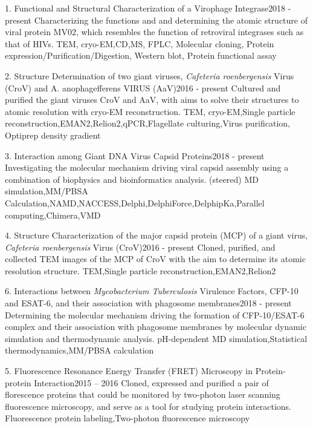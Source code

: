 %
%
%


\begin{projects}
	\project
	{1. Functional and Structural Characterization of a Virophage Integrase}{2018 - present}
	{Characterizing the functions and and determining the atomic structure of viral protein MV02, which resembles the function of retroviral integrases such as that of HIVs.}
	{TEM, cryo-EM,CD,MS, FPLC, Molecular cloning, Protein expression/Purification/Digestion, Western blot, Protein functional assay}
	
	\project
	{2. Structure Determination of two giant viruses, \textit{Cafeteria roenbergensis} Virus (CroV) and A. anophagefferens VIRUS (AaV)}{2016 - present}
	{Cultured and purified the giant viruses CroV and AaV, with aims to solve their structures  to atomic resolution with cryo-EM reconstruction.}
	{TEM, cryo-EM,Single particle reconstruction,EMAN2,Relion2,qPCR,Flagellate culturing,Virus purification, Optiprep density gradient}
	
	\project
	{3. Interaction among Giant DNA Virus Capsid Proteins}{2018 - present}
	{Investigating the molecular mechanism driving viral capsid assembly using a combination of biophysics and bioinformatics analysis.}
	{(steered) MD simulation,MM/PBSA Calculation,NAMD,NACCESS,Delphi,DelphiForce,DelphipKa,Parallel computing,Chimera,VMD}
	
	\project
	{4. Structure Characterization of the major capsid protein (MCP) of a giant virus, \textit{Cafeteria roenbergensis} Virus (CroV)}{2016 - present}
	{Cloned, purified, and collected TEM images of the MCP of CroV with the aim to determine its atomic resolution structure.}
	{TEM,Single particle reconstruction,EMAN2,Relion2}
	
	\project
	{6. Interactions between \textit{Mycobacterium Tuberculosis} Virulence Factors, CFP-10 and ESAT-6, and their association with phagosome membranes}{2018 - present}
	{Determining the molecular mechanism driving the formation of CFP-10/ESAT-6 complex and their association with phagosome membranes by molecular dynamic simulation and thermodynamic analysis.}
	{pH-dependent MD simulation,Statistical thermodynamics,MM/PBSA calculation}
	
	\project
	{5. Fluorescence Resonance Energy Transfer (FRET) Microscopy in Protein-protein Interaction}{2015 -- 2016}
	{Cloned, expressed and purified a pair of florescence proteins that could be monitored by two-photon laser scanning fluorescence microscopy, and serve as a tool for studying protein interactions.}
	{Fluorescence protein labeling,Two-photon fluorescence microscopy}
\end{projects}
